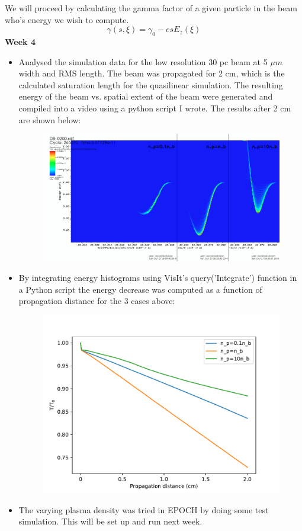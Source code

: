 \documentclass[%
onecolumn, notitlepage,
 amsmath,amssymb,
 aps,
]{article}
\begin{document}
We will proceed by calculating the gamma factor of a given particle in the beam who's energy we wish to compute.
\begin{equation}
\gamma(s,\xi)=\gamma_0-esE_z(\xi)
\end{equation}
\noindent \textbf{Week 4}\\
\begin{itemize}
\item[\textcolor{MancPurple}{\textbullet}] Analysed the simulation data for the low resolution 30 pc beam at 5 $\mu m$ width and RMS length. The beam was propagated for 2 cm, which is the calculated saturation length for the quasilinear simulation. The resulting energy of the beam vs. spatial extent of the beam were generated and compiled into a video using a python script I wrote. The results after 2 cm are shown below:
\begin{figure}[!ht]
\centering
\includegraphics[scale=0.3]{simulation30pc}
\end{figure}
\item[\textcolor{MancPurple}{\textbullet}] By integrating energy histograms using VisIt's query('Integrate') function in a Python script the energy decrease was computed as a function of propagation distance for the 3 cases above:
\begin{figure}[!ht]
\centering
\includegraphics[scale=0.8]{EnergyDecrease30pc.pdf}
\end{figure}
\item[\textcolor{MancPurple}{\textbullet}] The varying plasma density was tried in EPOCH by doing some test simulation. This will be set up and run next week. 
\end{itemize}
\end{document}
